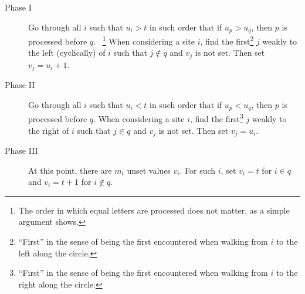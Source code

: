 \documentclass[reqno]{amsart}
\newcommand{\0}{\phantom{c}}
\theoremstyle{plain}
\theoremstyle{definition}
\numberwithin{equation}{section}
\begin{document}
\begin{description}
\item[Phase I]
  Go through all $i$ such that $u_i > t$ in such order that if $u_p > u_q$, then $p$ is processed before $q$.
  \ \footnote{The order in which equal letters are processed does not matter, as a simple argument shows.}
  When considering a site $i$, find the first\footnote{``First'' in the sense of being the first encountered when walking from $i$ to the left along the circle.}
  $j$ weakly to the left (cyclically) of $i$ such that $j \notin q$ and $v_j$ is not set.
  Then set $v_j = u_i + 1$.

\item[Phase II]
  Go through all $i$ such that $u_i < t$ in such order that if $u_p < u_q$, then $p$ is processed before $q$.
  When considering a site $i$, find the first\footnote{``First'' in the sense of being the first encountered when walking from $i$ to the right along the circle.}
  $j$ weakly to the right of $i$ such that $j \in q$ and $v_j$ is not set.
  Then set $v_j = u_i$.

\item[Phase III]
  At this point, there are $m_t$ unset values $v_i$. For such $i$, set $v_i = t$ for $i \in q$ and $v_i = t+1$ for $i\notin q$.
\end{description}
\end{document}
